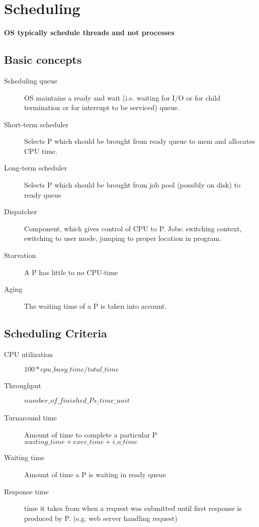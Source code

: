 \section*{Scheduling}
\textbf{OS typically schedule threads and not processes}

\subsection*{Basic concepts}
\begin{description}
  \item[Scheduling queue] OS maintains a ready and wait (i.e. waiting for I/O or for child termination or for interrupt to be serviced) queue.
  \item[Short-term scheduler] Selects P which should be brought from ready queue to mem and allocates CPU time.
  \item[Long-term scheduler] Selects P which should be brought from job pool (possibly on disk) to ready queue
  \item[Dispatcher] Component, which gives control of CPU to P. Jobs: switching context, switching to user mode, jumping to proper location in program.
  \item[Starvation] A P has little to no CPU-time
  \item[Aging] The waiting time of a P is taken into account.
\end{description}

\subsection*{Scheduling Criteria}
\begin{description}
  \item[CPU utilization] $100 * cpu\_busy\_time / total\_time$
  \item[Throughput] $number\_of\_finished\_Ps_/time\_unit$
  \item[Turnaround time] Amount of time to complete a particular P $waiting\_time+exec\_time+i\_o\_time$
  \item[Waiting time] Amount of time a P is waiting in ready queue
  \item[Response time] time it takes from when a request was submitted until first response is produced by P. (e.g. web server handling request)
\end{description}

